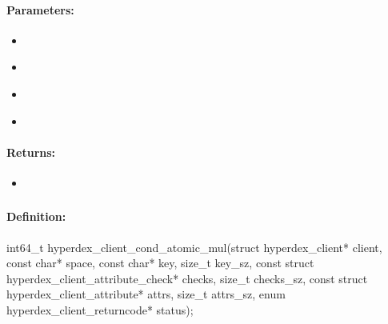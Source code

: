 \paragraph{Parameters:}
\begin{itemize}[noitemsep]
\item {}\\

\item {}\\

\item {}\\

\item {}\\

\end{itemize}

\paragraph{Returns:}
\begin{itemize}[noitemsep]
\item {}\\

\end{itemize}

\pagebreak
\subsubsection{}
\label{api:c:cond_atomic_mul}


\paragraph{Definition:}
\begin{ccode}
int64_t hyperdex_client_cond_atomic_mul(struct hyperdex_client* client,
        const char* space,
        const char* key, size_t key_sz,
        const struct hyperdex_client_attribute_check* checks, size_t checks_sz,
        const struct hyperdex_client_attribute* attrs, size_t attrs_sz,
        enum hyperdex_client_returncode* status);
\end{ccode}

